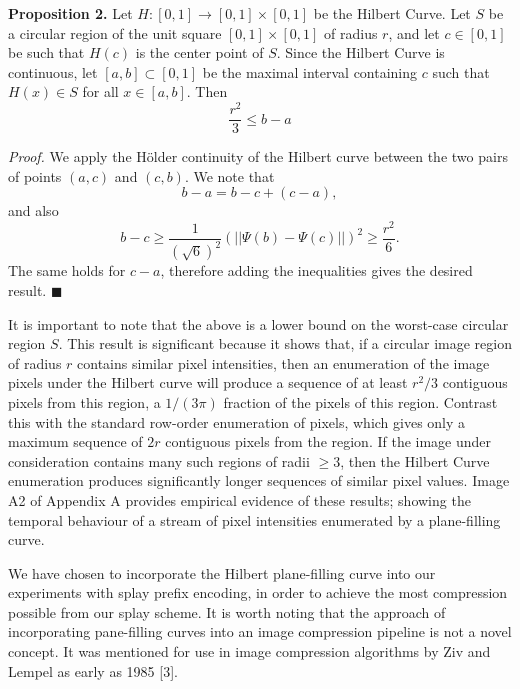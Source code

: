 \documentclass[twoside]{article}
\begin{document}
\begin{multicols}{2}
\vspace{0.5em}
\noindent \textbf{Proposition 2. } Let $H: [0, 1] \to [0, 1] \times [0, 1]$ be the Hilbert Curve. Let $S$ be a circular region of the unit square $[0, 1] \times [0, 1]$ of radius $r$, and let $c \in [0, 1]$ be such that $H(c)$ is the center point of $S$. Since the Hilbert Curve is continuous, let $[a, b] \subset [0, 1]$ be the maximal interval containing $c$ such that $H(x) \in S$ for all $x \in [a, b]$. Then
\[
\frac{r^2}{3} \leq b - a
\]

\vspace{0.5em}
\noindent \textit{Proof.} We apply the H\"older continuity of the Hilbert curve between the two pairs of points $(a, c)$ and $(c, b)$. We note that
\[
b - a = b - c + (c - a),
\]
and also
\[
b - c \geq \frac{1}{(\sqrt{6})^2}(||\Psi(b) - \Psi(c)||)^2 \geq \frac{r^2}{6}.
\]
The same holds for $c - a$, therefore adding the inequalities gives the desired result. $\blacksquare$

It is important to note that the above is a lower bound on the worst-case circular region $S$. This result is significant because it shows that, if a circular image region of radius $r$ contains similar pixel intensities, then an enumeration of the image pixels under the Hilbert curve will produce a sequence of at least $r^2/3$ contiguous pixels from this region, a $1/(3\pi)$ fraction of the pixels of this region. Contrast this with the standard row-order enumeration of pixels, which gives only a maximum sequence of $2r$ contiguous pixels from the region. If the image under consideration contains many such regions of radii $\geq 3$, then the Hilbert Curve enumeration produces significantly longer sequences of similar pixel values. Image A2 of Appendix A provides empirical evidence of these results; showing the temporal behaviour of a stream of pixel intensities enumerated by a plane-filling curve.

We have chosen to incorporate the Hilbert plane-filling curve into our experiments with splay prefix encoding, in order to achieve the most compression possible from our splay scheme. It is worth noting that the approach of incorporating pane-filling curves into an image compression pipeline is not a novel concept. It was mentioned for use in image compression algorithms by Ziv and Lempel as early as 1985 [3].


\end{multicols}
\end{document}
